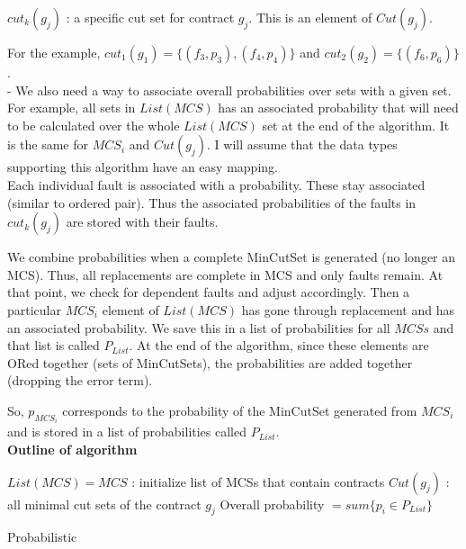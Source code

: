 $cut_k(g_j)$ : a specific cut set for contract $g_j$. This is an element of $Cut(g_j)$. 

For the example, $cut_1(g_1) = \{(f_3,p_3),(f_4,p_4)\}$ and $cut_2(g_2) = \{(f_6,p_6)\}$.\\

- We also need a way to associate overall probabilities over sets with a given set. For example, all sets in $List(MCS)$ has an associated probability that will need to be calculated over the whole $List(MCS)$ set at the end of the algorithm. It is the same for $MCS_i$ and $Cut(g_j)$. I will assume that the data types supporting this algorithm have an easy mapping. \\

Each individual fault is associated with a probability. These stay associated (similar to ordered pair). Thus the associated probabilities of the faults in $cut_k(g_j)$ are stored with their faults. 

We combine probabilities when a complete MinCutSet is generated (no longer an MCS). Thus, all replacements are complete in MCS and only faults remain. At that point, we check for dependent faults and adjust accordingly. Then a particular $MCS_i$ element of $List(MCS)$ has gone through replacement and has an associated probability. We save this in a list of probabilities for all $MCSs$ and that list is called $P_{List}$. At the end of the algorithm, since these elements are ORed together (sets of MinCutSets), the probabilities are added together (dropping the error term).

So, $p_{MCS_i}$ corresponds to the probability of the MinCutSet generated from $MCS_i$ and is stored in a list of probabilities called $P_{List}$. \\

\textbf{Outline of algorithm}\\

\begin{algorithm}[H]
	$List(MCS) = {MCS}$ : initialize list of MCSs that contain contracts \;
	$Cut(g_j)$ : all minimal cut sets of the contract $g_j$ \;
	Overall probability $= sum\{p_i \in P_{List}\}$ \;
	\caption{Probabilistic}
	\label{alg:repl_alg}
\end{algorithm}


